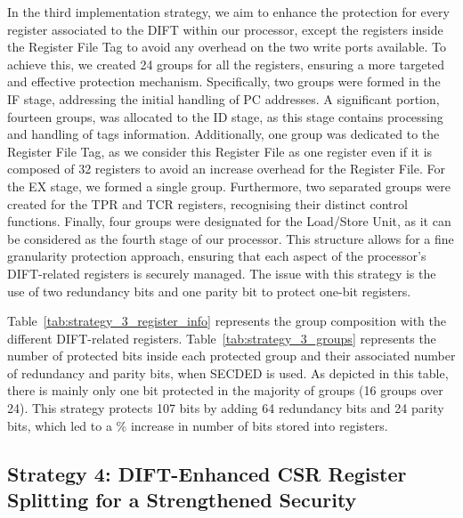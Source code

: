 In the third implementation strategy, we aim to enhance the protection for every register associated to the DIFT within our processor, except the registers inside the Register File Tag to avoid any overhead on the two write ports available. To achieve this, we created 24 groups for all the registers, ensuring a more targeted and effective protection mechanism. Specifically, two groups were formed in the IF stage, addressing the initial handling of PC addresses. A significant portion, fourteen groups, was allocated to the ID stage, as this stage contains processing and handling of tags information. Additionally, one group was dedicated to the Register File Tag, as we consider this Register File as one register even if it is composed of 32 registers to avoid an increase overhead for the Register File. For the EX stage, we formed a single group. Furthermore, two separated groups were created for the TPR and TCR registers, recognising their distinct control functions. Finally, four groups were designated for the Load/Store Unit, as it can be considered as the fourth stage of our processor. This structure allows for a fine granularity protection approach, ensuring that each aspect of the processor's DIFT-related registers is securely managed. The issue with this strategy is the use of two redundancy bits and one parity bit to protect one-bit registers.

Table~\ref{tab:strategy_3_register_info} represents the group composition with the different DIFT-related registers.
Table~\ref{tab:strategy_3_groups} represents the number of protected bits inside each protected group and their associated number of redundancy and parity bits, when SECDED is used. As depicted in this table, there is mainly only one bit protected in the majority of groups (16 groups over 24). This strategy protects 107 bits by adding 64 redundancy bits and 24 parity bits, which led to a \% increase in number of bits stored into registers.

\subsection{Strategy 4: DIFT-Enhanced CSR Register Splitting for a Strengthened Security}

